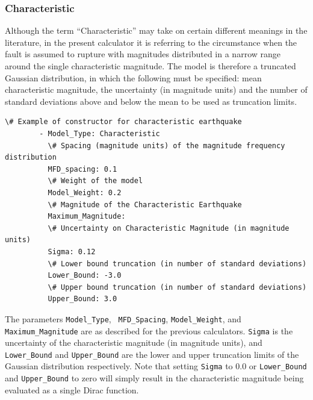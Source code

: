 \subsubsection{Characteristic}

Although the term ``Characteristic'' may take on certain different meanings in the literature, in the present calculator it is referring to the circumstance when the fault is assumed to rupture with magnitudes distributed in a narrow range around the single characteristic magnitude. The model is therefore a truncated Gaussian distribution, in which the following must be specified: mean characteristic magnitude, the uncertainty (in magnitude units) and the number of standard deviations above and below the mean to be used as truncation limits.

\begin{Verbatim}[frame=single, commandchars=\\\{\}, fontsize=\scriptsize]
          \# Example of constructor for characteristic earthquake
        - Model_Type: Characteristic
          \# Spacing (magnitude units) of the magnitude frequency distribution
          MFD_spacing: 0.1
          \# Weight of the model
          Model_Weight: 0.2
          \# Magnitude of the Characteristic Earthquake
          Maximum_Magnitude:
          \# Uncertainty on Characteristic Magnitude (in magnitude units)
          Sigma: 0.12
          \# Lower bound truncation (in number of standard deviations)
          Lower_Bound: -3.0
          \# Upper bound truncation (in number of standard deviations)
          Upper_Bound: 3.0
\end{Verbatim}

The parameters \verb=Model_Type=, \verb= MFD_Spacing=, \verb=Model_Weight=, and\verb= Maximum_Magnitude= are as described for the previous calculators. \verb=Sigma= is the uncertainty of the characteristic magnitude (in magnitude units), and \verb=Lower_Bound= and \verb=Upper_Bound= are the lower and upper truncation limits of the Gaussian distribution respectively. Note that setting \verb=Sigma= to 0.0 or \verb=Lower_Bound= and \verb=Upper_Bound= to zero will simply result in the characteristic magnitude being evaluated as a single Dirac function.

